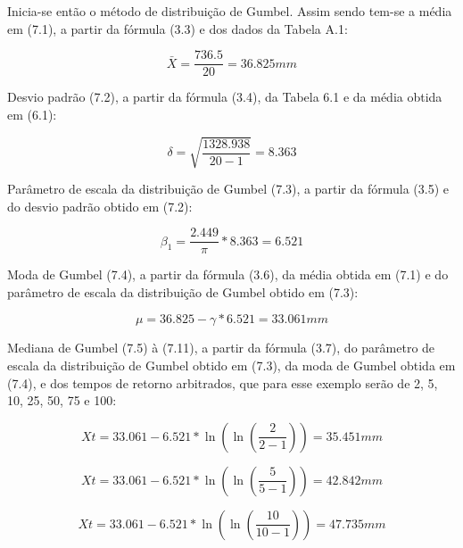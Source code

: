 Inicia-se então o método de distribuição de Gumbel. Assim sendo tem-se a média em (7.1), a partir da fórmula (3.3) e dos dados da Tabela A.1:\bigskip

\begin{equation}
\bar{X} = \frac{736.5}{20} = 36.825 mm
\end{equation}\bigskip

\newpage
 
Desvio padrão (7.2), a partir da fórmula (3.4), da Tabela 6.1 e da média obtida em (6.1):\bigskip

\begin{equation}
\delta = \sqrt{\frac{1328.938}{20 - 1}} = 8.363
\end{equation}\bigskip

Parâmetro de escala da distribuição de Gumbel (7.3), a partir da fórmula (3.5) e do desvio padrão obtido em (7.2):\bigskip

\begin{equation}
\beta_1 = \frac{2.449}{\pi} * 8.363 = 6.521
\end{equation}\bigskip

Moda de Gumbel (7.4), a partir da fórmula (3.6), da média obtida em (7.1) e do parâmetro de escala da distribuição de Gumbel obtido em (7.3):\bigskip

\begin{equation}
\mu = 36.825 - \gamma * 6.521 = 33.061 mm
\end{equation}\bigskip

Mediana de Gumbel (7.5) à (7.11), a partir da fórmula (3.7), do parâmetro de escala da distribuição de Gumbel obtido em (7.3), da moda de Gumbel obtida em (7.4), e dos tempos de retorno arbitrados, que para esse exemplo serão de 2, 5, 10, 25, 50, 75 e 100:\bigskip

\begin{equation}
Xt = 33.061 - 6.521 * \ln{\left(\ln{\left(\frac{2}{2 - 1}\right)}\right)} = 35.451 mm
\end{equation}

\begin{equation}
Xt = 33.061 - 6.521 * \ln{\left(\ln{\left(\frac{5}{5 - 1}\right)}\right)} = 42.842 mm
\end{equation}

\begin{equation}
Xt = 33.061 - 6.521 * \ln{\left(\ln{\left(\frac{10}{10 - 1}\right)}\right)} = 47.735 mm
\end{equation}

